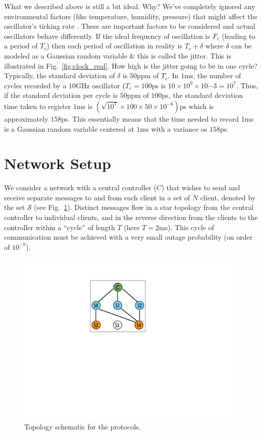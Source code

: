 \documentclass[10pt, journal, letter, onecolumn]{IEEEtran}
\begin{document}
What we described above is still a bit ideal. Why? We've completely ignored any environmental factors (like temperature, humidity, pressure) that might affect the oscillator's ticking rate \cite{frerking2012crystal}. These are important factors to be considered and actual oscillators behave differently. If the ideal frequency of oscillation is $F_c$ (leading to a period of $T_c$) then each period of oscillation in reality is $T_c + \delta$ where $\delta$ can be modeled as a Gaussian random variable \& this is called the jitter. This is illustrated in Fig.~\ref{fig:clock_real}. How high is the jitter going to be in one cycle? Typically, the standard deviation of $\delta$ is $50$ppm of $T_c$. In $1$ms, the number of cycles recorded by a $10$GHz oscillator ($T_c = 100$ps is $10 \times 10^{9} \times 10{-3} = 10^{7}$. Thus, if the standard deviation per cycle is $50$ppm of $100$ps, the standard deviation time taken to register $1$ms is $\left(\sqrt{10^7} \times 100 \times 50 \times 10^{-6}\right)$ps which is approximately $158$ps. This essentially means that the time needed to record $1$ms is a Gaussian random variable centered at $1$ms with a variance os $158$ps.

\section{Network Setup}
\label{sec:setup}

We consider a network with a central controller ($C$) that wishes to send and receive separate messages to and from each client in a set of $N$ client, denoted by the set $\mathcal{S}$ (see Fig.~\ref{fig:setup}). Distinct messages flow in a star topology from the central controller to individual clients, and in the reverse direction from the clients to the controller within a ``cycle'' of length $T$ (here $T = 2$ms). This cycle of communication must be achieved with a very small outage probability (on order of $10^{-9}$).

\begin{figure}
  \begin{center}
    \includegraphics[scale = 0.5]{figures/bubbles_3}
  \end{center}
  \caption{Topology schematic for the protocols.}
  \label{fig:setup}
\end{figure}
\end{document}
